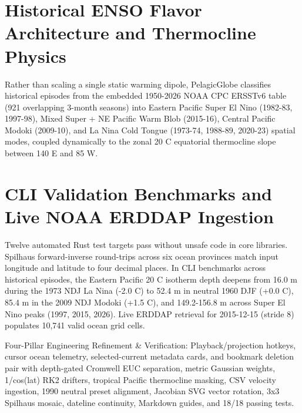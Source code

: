 \documentclass[10pt,letterpaper]{article}
\begin{document}
\section{Historical ENSO Flavor Architecture and Thermocline Physics}
Rather than scaling a single static warming dipole, PelagicGlobe classifies historical episodes from the embedded 1950-2026 NOAA CPC ERSSTv6 table (921 overlapping 3-month seasons) into Eastern Pacific Super El Nino (1982-83, 1997-98), Mixed Super + NE Pacific Warm Blob (2015-16), Central Pacific Modoki (2009-10), and La Nina Cold Tongue (1973-74, 1988-89, 2020-23) spatial modes, coupled dynamically to the zonal 20 C equatorial thermocline slope between 140 E and 85 W.

\section{CLI Validation Benchmarks and Live NOAA ERDDAP Ingestion}
Twelve automated Rust test targets pass without unsafe code in core libraries. Spilhaus forward-inverse round-trips across six ocean provinces match input longitude and latitude to four decimal places. In CLI benchmarks across historical episodes, the Eastern Pacific 20 C isotherm depth deepens from 16.0 m during the 1973 NDJ La Nina (-2.0 C) to 52.4 m in neutral 1960 DJF (+0.0 C), 85.4 m in the 2009 NDJ Modoki (+1.5 C), and 149.2-156.8 m across Super El Nino peaks (1997, 2015, 2026). Live ERDDAP retrieval for 2015-12-15 (stride 8) populates 10,741 valid ocean grid cells.

Four-Pillar Engineering Refinement \& Verification: Playback/projection hotkeys, cursor ocean telemetry, selected-current metadata cards, and bookmark deletion pair with depth-gated Cromwell EUC separation, metric Gaussian weights, 1/cos(lat) RK2 drifters, tropical Pacific thermocline masking, CSV velocity ingestion, 1990 neutral preset alignment, Jacobian SVG vector rotation, 3x3 Spilhaus mosaic, dateline continuity, Markdown guides, and 18/18 passing tests.
\end{document}
